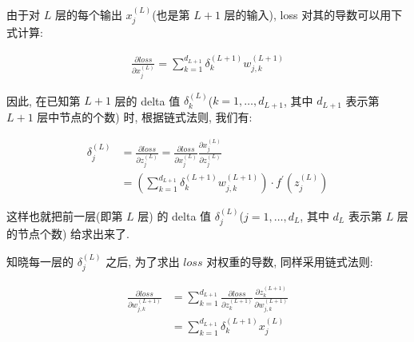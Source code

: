 \documentclass{article}
\newcommand{\figNode}[4]{\node(#1)
	at #4 {\texttt{[image: \#2]}}}
\begin{document}


由于对 $L$ 层的每个输出 $x^{(L)}_j$(也是第 $L+1$ 层的输入), loss 对其的导数可以用下式计算:

$$
\begin{aligned}
\frac{\partial loss}{\partial x^{(L)}_j} = \sum_{k = 1}^{d_{L+1}}\delta_k^{(L+1)}w_{j, k}^{(L + 1)}
\end{aligned}
$$

因此, 在已知第 $L+1$ 层的 delta 值 $\delta^{(L)}_k$($k=1, \ldots, d_{L+1}$, 其中 $d_{L+1}$ 表示第 $L+1$ 层中节点的个数) 时, 根据链式法则, 我们有:

$$
\begin{aligned}
\delta^{(L)}_j &= \frac{\partial loss}{\partial z^{(L)}_j} = \frac{\partial loss}{\partial x^{(L)}_j}\frac{\partial x^{(L)}_j}{\partial z^{(L)}_j} \\
 &= \left(\sum_{k = 1}^{d_{L+1}}\delta_k^{(L+1)}w_{j, k}^{(L + 1)}\right)\cdot f^\prime(z^{(L)}_j) 
\end{aligned}
$$

这样也就把前一层(即第 $L$ 层) 的 delta 值 $\delta^{(L)}_j$($j=1, \ldots, d_{L}$, 其中 $d_L$ 表示第 $L$ 层的节点个数) 给求出来了.

知晓每一层的 $\delta^{(L)}_j$ 之后, 为了求出 $loss$ 对权重的导数, 同样采用链式法则:

$$
\begin{aligned}
\frac{\partial loss}{\partial w_{j, k}^{(L+1)}} &= \sum_{k = 1}^{d_{L+1}}\frac{\partial loss}{\partial z_{k}^{(L+1)}}\frac{\partial z_{k}^{(L+1)}}{\partial w_{j, k}^{(L+1)}} \\
&= \sum_{k = 1}^{d_{L+1}}\delta_k^{(L+1)}x_j^{(L)}
\end{aligned}
$$
\end{document}
